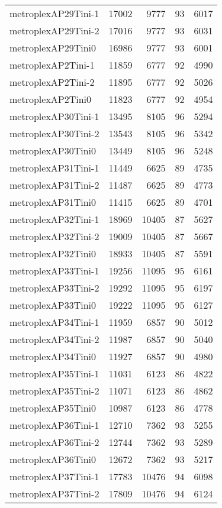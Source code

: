 \begin{longtable}{lrrrr}
metroplexAP29Tini-1 & 17002 & 9777 & 93 & 6017 \\
metroplexAP29Tini-2 & 17016 & 9777 & 93 & 6031 \\
metroplexAP29Tini0 & 16986 & 9777 & 93 & 6001 \\
metroplexAP2Tini-1 & 11859 & 6777 & 92 & 4990 \\
metroplexAP2Tini-2 & 11895 & 6777 & 92 & 5026 \\
metroplexAP2Tini0 & 11823 & 6777 & 92 & 4954 \\
metroplexAP30Tini-1 & 13495 & 8105 & 96 & 5294 \\
metroplexAP30Tini-2 & 13543 & 8105 & 96 & 5342 \\
metroplexAP30Tini0 & 13449 & 8105 & 96 & 5248 \\
metroplexAP31Tini-1 & 11449 & 6625 & 89 & 4735 \\
metroplexAP31Tini-2 & 11487 & 6625 & 89 & 4773 \\
metroplexAP31Tini0 & 11415 & 6625 & 89 & 4701 \\
metroplexAP32Tini-1 & 18969 & 10405 & 87 & 5627 \\
metroplexAP32Tini-2 & 19009 & 10405 & 87 & 5667 \\
metroplexAP32Tini0 & 18933 & 10405 & 87 & 5591 \\
metroplexAP33Tini-1 & 19256 & 11095 & 95 & 6161 \\
metroplexAP33Tini-2 & 19292 & 11095 & 95 & 6197 \\
metroplexAP33Tini0 & 19222 & 11095 & 95 & 6127 \\
metroplexAP34Tini-1 & 11959 & 6857 & 90 & 5012 \\
metroplexAP34Tini-2 & 11987 & 6857 & 90 & 5040 \\
metroplexAP34Tini0 & 11927 & 6857 & 90 & 4980 \\
metroplexAP35Tini-1 & 11031 & 6123 & 86 & 4822 \\
metroplexAP35Tini-2 & 11071 & 6123 & 86 & 4862 \\
metroplexAP35Tini0 & 10987 & 6123 & 86 & 4778 \\
metroplexAP36Tini-1 & 12710 & 7362 & 93 & 5255 \\
metroplexAP36Tini-2 & 12744 & 7362 & 93 & 5289 \\
metroplexAP36Tini0 & 12672 & 7362 & 93 & 5217 \\
metroplexAP37Tini-1 & 17783 & 10476 & 94 & 6098 \\
metroplexAP37Tini-2 & 17809 & 10476 & 94 & 6124 \\

\end{longtable}
